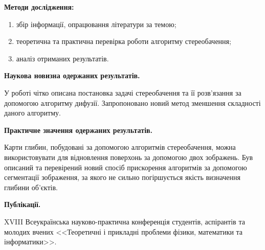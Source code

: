 \textbf{Методи дослідження:}
\begin{enumerate}
    \item збір інформації, опрацювання літератури за темою;
    \item теоретична та практична перевірка роботи алгоритму стереобачення;
    \item аналіз отриманих результатів.
\end{enumerate}

\textbf{Наукова новизна одержаних результатів.}

У роботі чітко описана постановка задачі стереобачення
та її розв'язання за допомогою алгоритму дифузії.
Запропоновано новий метод зменшення складності даного алгоритму.

\textbf{Практичне значення одержаних результатів.}

Карти глибин, побудовані за допомогою алгоритмів стереобачення,
можна використовувати для відновлення поверхонь за допомогою двох зображень.
Був описаний та перевірений
новий спосіб прискорення алгоритмів за допомогою сегментації зображення,
за якого не сильно погіршується якість визначення глибини об'єктів.

\textbf{Публікації.}

XVIII Всеукраїнська науково-практична конференція студентів,
аспірантів та молодих вчених <<Теоретичні і прикладні проблеми фізики,
математики та інформатики>>.
